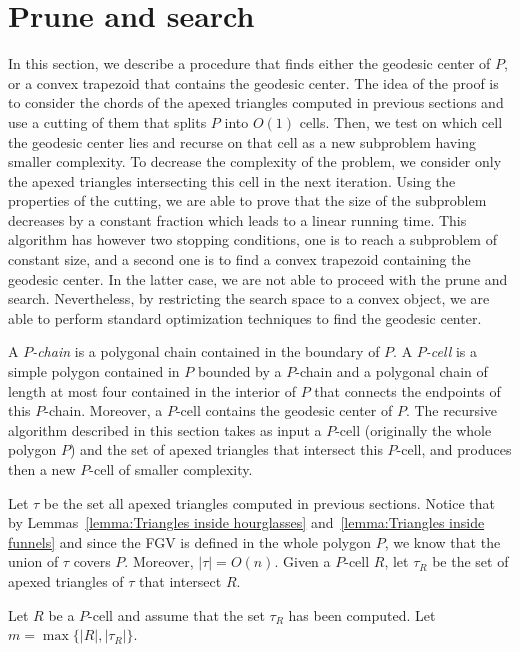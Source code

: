 \documentclass[a4paper,UKenglish]{lipics}
\begin{document}
\section{Prune and search}\label{section:Prune and search}

In this section, we describe a procedure that finds either the geodesic center of $P$, or a convex trapezoid that contains the geodesic center.
The idea of the proof is to consider the chords of the apexed triangles computed in previous sections and use a cutting of them that splits $P$ into $O(1)$ cells. Then, we test on which cell the geodesic center lies and recurse on that cell as a new subproblem having smaller complexity. To decrease the complexity of the problem, we consider only the apexed triangles intersecting this cell in the next iteration. Using the properties of the cutting, we are able to prove that the size of the subproblem decreases by a constant fraction which leads to a linear running time. This algorithm has however two stopping conditions, one is to reach a subproblem of constant size, and a second one is to find a convex trapezoid containing the geodesic center. In the latter case, we are not able to proceed with the prune and search. Nevertheless, by restricting the search space to a convex object, we are able to perform standard optimization techniques to find the geodesic center.

A \emph{$P$-chain} is a polygonal chain contained in the boundary of $P$.
A \emph{$P$-cell} is a simple polygon contained in $P$ bounded by a $P$-chain and a polygonal chain of length at most four contained in the interior of $P$ that connects the endpoints of this $P$-chain. Moreover, a $P$-cell contains the geodesic center of $P$.
The recursive algorithm described in this section takes as input a $P$-cell (originally the whole polygon $P$) and the set of apexed triangles that intersect this $P$-cell, and produces then a new $P$-cell of smaller complexity.

Let $\tau$ be the set all apexed triangles computed in previous sections. Notice that by Lemmas~\ref{lemma:Triangles inside hourglasses} and~\ref{lemma:Triangles inside funnels} and since the FGV is defined in the whole polygon $P$, we know that the union of $\tau$ covers $P$. Moreover, $|\tau| = O(n)$.
Given a $P$-cell $R$, let $\tau_R$ be the set of apexed triangles of $\tau$ that intersect $R$.

Let $R$ be a $P$-cell and assume that the set $\tau_R$ has been computed.
Let $m = \max\{|R|, |\tau_R|\}$.
\end{document}
